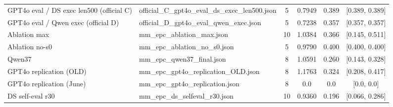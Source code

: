 \documentclass[11pt]{article}
\begin{document}
\begin{table}[t]
\begin{tabular}{@{}lp{}cccc@{}}
    GPT4o eval / DS exec len500 (official C) & official\_\hspace{0pt}C\_\hspace{0pt}gpt4o\_\hspace{0pt}eval\_\hspace{0pt}ds\_\hspace{0pt}exec\_\hspace{0pt}len500.json & 5 & 0.7949 & 0.389 & [0.389, 0.389] \\
    GPT4o eval / Qwen exec (official D) & official\_\hspace{0pt}D\_\hspace{0pt}gpt4o\_\hspace{0pt}eval\_\hspace{0pt}qwen\_\hspace{0pt}exec.json & 5 & 0.7238 & 0.357 & [0.357, 0.357] \\
    Ablation max & mm\_\hspace{0pt}epc\_\hspace{0pt}ablation\_\hspace{0pt}max.json & 10 & 1.0384 & 0.366 & [0.145, 0.511] \\
    Ablation no-s0 & mm\_\hspace{0pt}epc\_\hspace{0pt}ablation\_\hspace{0pt}no\_\hspace{0pt}s0.json & 5 & 0.9790 & 0.400 & [0.400, 0.400] \\
    Qwen37 & mm\_\hspace{0pt}epc\_\hspace{0pt}qwen37\_\hspace{0pt}final.json & 8 & 1.0591 & 0.260 & [0.143, 0.328] \\
    GPT4o replication (OLD) & mm\_\hspace{0pt}epc\_\hspace{0pt}gpt4o\_\hspace{0pt}replication\_\hspace{0pt}OLD.json & 8 & 1.1763 & 0.324 & [0.208, 0.417] \\
    GPT4o replication (June) & mm\_\hspace{0pt}epc\_\hspace{0pt}gpt4o\_\hspace{0pt}replication.json & 8 & 0.0 & 0.0 & [0.0, 0.0] \\
    DS self-eval r30 & mm\_\hspace{0pt}epc\_\hspace{0pt}ds\_\hspace{0pt}selfeval\_\hspace{0pt}r30.json & 10 & 0.9360 & 0.196 & [0.066, 0.286] \\
\bottomrule
\end{tabular}
\end{table}
\end{document}
